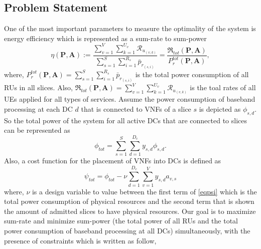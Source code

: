 \documentclass[conference]{IEEEtran}
\begin{document}
\subsection{Problem Statement}
One of the most important parameters to measure the optimality of the system is energy efficiency which is represented as a sum-rate to sum-power
\begin{equation}
\eta(\boldsymbol{P},\boldsymbol{A}) := \frac{\sum\limits_{v=1}^{V} \sum\limits_{k=1}^{{U}_v}\mathcal{R}_{u_{(v,k)}} }{\sum\limits_{s=1}^{S} \sum\limits_{i=1}^{{R}_s}\bar{p}_{r_{(s,i)}}} = \frac{\mathfrak{R}_{tot}(\boldsymbol{P},\boldsymbol{A})}{P_r^{{tot}}(\boldsymbol{P},\boldsymbol{A})},
\end{equation}
where, $P_r^{tot}(\boldsymbol{P},\boldsymbol{A}) = \sum\limits_{s=1}^{S}\sum\limits_{i=1}^{{R}_s}\bar{p}_{r_{(s,i)}}$ is the total power consumption of all RUs in all slices. Also, $\mathfrak{R}_{tot}(\boldsymbol{P},\boldsymbol{A}) = \sum\limits_{v=1}^{V} \sum\limits_{k=1}^{{U}_v}\mathcal{R}_{u_{(v,k)}} $ is the toal rates of all UEs applied for all types of services.
Assume the power consumption of baseband processing at each DC $d$ that is connected to VNFs of a slice $s$ is depicted as
$\phi_{s,d}$. So the total power of the system for all active DCs that are connected to slices can be represented as
\begin{equation*}
\phi_{tot} = \sum_{s=1}^{S}\sum_{d=1}^{D_c}y_{s,d}\phi_{s,d}.
\end{equation*}
Also, a cost function for the placement of VNFs into DCs is defined as
\begin{equation}\label{eqpsi}
 \psi_{tot} = \phi_{tot} - \nu \sum_{d=1}^{D_c}\sum_{v=1}^{V}y_{s,d}a_{v,s}
\end{equation}
where, $\nu$ is a design variable to value between the first term of \eqref{eqpsi} which is the total power consumption of physical resources and the second term that is shown the amount of admitted slices to have physical resources.
Our goal is to maximize sum-rate and minimize sum-power (the total power of all RUs and the total power consumption of baseband processing at all DCs) simultaneously, with the presence of constraints which is written as follow,
\end{document}
